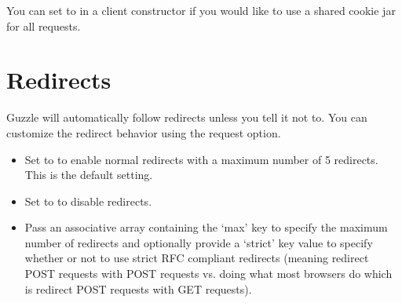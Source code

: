 \documentclass[a4paper,11pt,spanish]{sphinxmanual}
\begin{document}
You can set  to  in a client constructor if you would like
to use a shared cookie jar for all requests.

\begin{sphinxVerbatim}[commandchars=\\\{\}]
   \PYG{p}{([}  \PYG{p}{]);}
   
\end{sphinxVerbatim}


\chapter{Redirects}
\label{\detokenize{quickstart:redirects}}
Guzzle will automatically follow redirects unless you tell it not to. You can
customize the redirect behavior using the  request option.
\begin{itemize}
\item {} 
Set to  to enable normal redirects with a maximum number of 5
redirects. This is the default setting.

\item {} 
Set to  to disable redirects.

\item {} 
Pass an associative array containing the `max' key to specify the maximum
number of redirects and optionally provide a `strict' key value to specify
whether or not to use strict RFC compliant redirects (meaning redirect POST
requests with POST requests vs. doing what most browsers do which is
redirect POST requests with GET requests).

\end{itemize}

\begin{sphinxVerbatim}[commandchars=\\\{\}]
   
 
\end{sphinxVerbatim}
\end{document}
